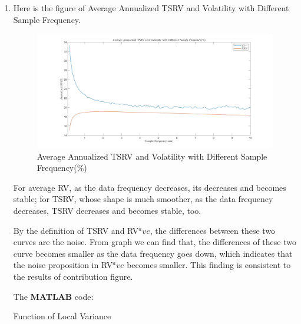 \documentclass[12pt,letterpaper]{article}
\begin{document}
\begin{enumerate}[label=\textbf{(\Alph*)}]
\item
Here is the figure of Average Annualized TSRV and Volatility with Different Sample Frequency.
\begin{figure}[H]
	\centering
	\includegraphics[width=12cm]{figures/ex7_H.jpg}
	\caption{Average Annualized TSRV and Volatility with Different Sample Frequency(\%)}
\end{figure}
For average RV, as the data frequency decreases, its decreases and becomes stable; for TSRV, whose shape is much smoother, as the data frequency decreases, TSRV decreases and becomes stable, too.

 By the definition of TSRV and RV$^ave$, the differences between these two curves are the noise. From graph we can find that, the differences of these two curve becomes smaller as the data frequency goes down, which indicates that the noise proposition in RV$^ave$ becomes smaller. This finding is consistent to the results of contribution figure.\\
\newpage
 



The \textbf{MATLAB} code:

Function of Local Variance


\end{enumerate}
 
\end{document}
